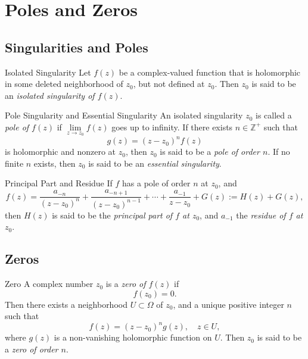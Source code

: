 

\section{Poles and Zeros}

\subsection{Singularities and Poles}

\begin{definition}{Isolated Singularity}{}
  Let $f(z)$ be a complex-valued function that is holomorphic
  in some deleted neighborhood of $z_0$, but not defined at $z_0$.
  Then $z_0$ is said to be an \emph{isolated singularity of $f(z)$}.
\end{definition}

\begin{definition}{Pole Singularity and Essential Singularity}{}
  An isolated singularity $z_0$ is called a \emph{pole of $f(z)$}
  if $\lim \limits _{z \rightarrow z_0}f(z)$ goes up to infinity.
  If there exists $n \in \mathbb{Z}^+$ such that
  \begin{equation}
    g(z) = (z-z_0)^n f(z)
  \end{equation}
  is holomorphic and nonzero at $z_0$,
  then $z_0$ is said to be a \emph{pole of order $n$}.
  If no finite $n$ exists, then $z_0$ is said to be an \emph{essential singularity}.
\end{definition}

\begin{definition}{Principal Part and Residue}{}
  If $f$ has a pole of order $n$ at $z_0$, and
  \begin{equation}
    f(z) = \frac{a_{-n}}{(z-z_0)^n} + \frac{a_{-n+1}}{(z-z_0)^{n-1}} + \cdots + \frac{a_{-1}}{z-z_0} + G(z)
    := H(z) + G(z),
  \end{equation}
  then $H(z)$ is said to be the \emph{principal part of $f$ at $z_0$},
  and $a_{-1}$ the \emph{residue of $f$ at $z_0$}.
\end{definition}

\subsection{Zeros}

\begin{definition}{Zero}{}
  A complex number $z_0$ is a \emph{zero of $f(z)$} if
  \begin{equation}
    f(z_0) = 0.
  \end{equation}
  Then there exists a neighborhood $U \subset \Omega$ of $z_0$,
  and a unique positive integer $n$ such that
  \begin{equation}
    f(z) = (z - z_0)^n g(z), \quad z \in U,
  \end{equation}
  where $g(z)$ is a non-vanishing holomorphic function on $U$.
  Then $z_0$ is said to be a \emph{zero of order $n$}.
\end{definition}

